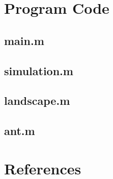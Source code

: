 \documentclass[11pt]{article}
\begin{document}
\section{Program Code}

\subsection{main.m}

\subsection{simulation.m}

\subsection{landscape.m}

\subsection{ant.m}

\section{References}


\listoffigures
\end{document}
